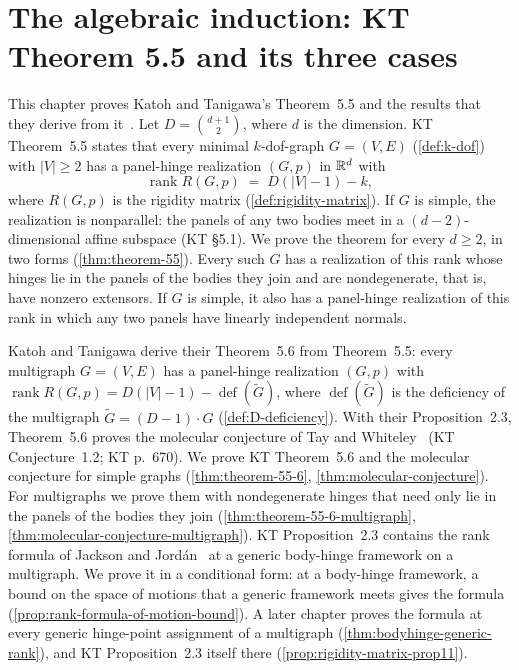 \section{The algebraic induction: KT Theorem 5.5 and its three cases}
\label{sec:molecular-algebraic-induction}

This chapter proves Katoh and Tanigawa's Theorem~5.5 and the results
that they derive from it~\cite[\S\S5--6]{katohTanigawa2011}. Let
$D = \binom{d+1}{2}$, where $d$ is the dimension. KT Theorem~5.5 states
that every minimal $k$-dof-graph $G = (V, E)$ (\cref{def:k-dof}) with
$|V| \ge 2$ has a panel-hinge realization $(G,p)$ in ${\mathbb{R}}^d$ with
\[
  \operatorname{rank} R(G,p) \;=\; D(|V| - 1) - k,
\]
where $R(G,p)$ is the rigidity matrix (\cref{def:rigidity-matrix}). If
$G$ is simple, the realization is nonparallel: the panels of any two
bodies meet in a $(d-2)$-dimensional affine subspace (KT \S5.1). We
prove the theorem for every $d \ge 2$, in two forms
(\cref{thm:theorem-55}). Every such $G$ has a realization of this rank
whose hinges lie in the panels of the bodies they join and are
nondegenerate, that is, have nonzero extensors. If $G$ is simple, it
also has a panel-hinge realization of this rank in which any two panels
have linearly independent normals.

Katoh and Tanigawa derive their Theorem~5.6 from Theorem~5.5: every
multigraph $G = (V, E)$ has a panel-hinge realization $(G,p)$ with
$\operatorname{rank} R(G,p) = D(|V| - 1) - \operatorname{def}(\tilde G)$,
where $\operatorname{def}(\tilde G)$ is the deficiency of the multigraph
$\tilde G = (D-1)\cdot G$ (\cref{def:D-deficiency}). With their
Proposition~2.3, Theorem~5.6 proves the molecular conjecture of Tay and
Whiteley~\cite{tayWhiteley1984} (KT Conjecture~1.2; KT p.~670). We prove
KT Theorem~5.6 and the molecular conjecture for simple graphs
(\cref{thm:theorem-55-6}, \cref{thm:molecular-conjecture}). For
multigraphs we prove them with nondegenerate hinges that need only lie
in the panels of the bodies they join
(\cref{thm:theorem-55-6-multigraph},
\cref{thm:molecular-conjecture-multigraph}). KT Proposition~2.3
contains the rank formula of Jackson and
Jord\'an~\cite[Theorem~6.1]{jacksonJordan2009} at a generic body-hinge
framework on a multigraph. We prove it in a conditional form: at a
body-hinge framework, a bound on the space of motions that a generic
framework meets gives the formula (\cref{prop:rank-formula-of-motion-bound}).
A later chapter proves the formula at every generic hinge-point
assignment of a multigraph (\cref{thm:bodyhinge-generic-rank}), and KT
Proposition~2.3 itself there (\cref{prop:rigidity-matrix-prop11}).

